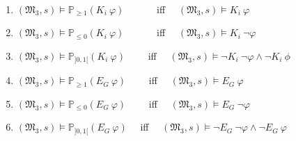 \begin{theorem} \label{theorm:Epistemic-equivalence} \ \ \ \

    \begin{enumerate}
        \item $(\mathfrak{M_3},s)\models \mathbb{P}_{\geq1}(K_i~\varphi)$  ~~~~~~iff~~  $(\mathfrak{M_3},s) \models K_i~\varphi$
        \item $(\mathfrak{M_3},s)\models \mathbb{P}_{\leq 0}(K_i~\varphi)$   ~~~~~~iff~~  $(\mathfrak{M_3},s)\models K_i ~\neg \varphi$
        \item $(\mathfrak{M_3},s)\models \mathbb{P}_{]0,1[}(K_i~\varphi)$  ~~~~iff~~   $(\mathfrak{M_3},s)\models \neg K_i~\neg\varphi \wedge \neg K_i~\phi$
        \item $(\mathfrak{M_3},s)\models \mathbb{P}_{\geq1}(E_G~\varphi)$  ~~~~iff~~  $(\mathfrak{M_3},s) \models E_G~\varphi$
        \item $(\mathfrak{M_3},s)\models \mathbb{P}_{\leq 0}(E_G~\varphi)$   ~~~~iff~~  $(\mathfrak{M_3},s)\models E_G ~\neg \varphi$
        \item $(\mathfrak{M_3},s)\models \mathbb{P}_{]0,1[}(E_G~\varphi)$  ~~iff~~   $(\mathfrak{M_3},s)\models \neg E_G~\neg\varphi \wedge \neg E_G~\varphi$

    \end{enumerate}

\end{theorem}


